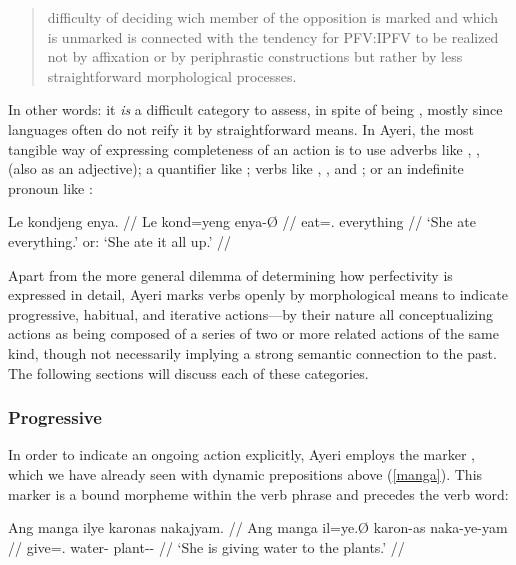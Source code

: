 \blockcquote[73]{dahl1985}{difficulty of deciding wich member of the 
opposition is marked and which is unmarked is connected with the tendency for 
PFV:IPFV to be realized not by affixation or by periphrastic constructions but 
rather by less straightforward morphological processes.}

In other words: it \emph{is} a difficult category to assess, in spite of being 
, 
mostly since languages often do not reify it by straightforward means. In 
Ayeri, the most tangible way of expressing completeness of an action is 
to use adverbs like , , 
 (also as an adjective); a quantifier 
like ; verbs like , 
, and ; or an indefinite pronoun 
like :

\ex\begingl
	\gla Le kondjeng enya. //
	\glb Le kond=yeng enya-Ø //
	\glc \PatTI{} eat=\TsgF{}.\Aarg{} everything //
	\glft `She ate everything.' or: `She ate it all up.' //
\endgl\xe

Apart from the more general dilemma of determining how perfectivity is expressed 
in detail, Ayeri marks verbs openly by morphological means to indicate 
progressive, habitual, and iterative actions---by their nature all 
conceptualizing actions as being composed of a series of two or more related 
actions of the same kind, though not necessarily implying a strong semantic 
connection to the past. The following sections will discuss each of these 
categories.

\subsubsection{Progressive}

In order to indicate an ongoing action explicitly, Ayeri employs the marker 
, which we have already seen with dynamic prepositions above 
(\autoref{manga}). This marker is a bound morpheme within the verb phrase and 
precedes the verb word:

\ex\label{ex:presprog}\begingl
	\gla Ang manga ilye karonas nakajyam. //
	\glb Ang manga il=ye.Ø karon-as naka-ye-yam //
	\glc \AgtT{} \Prog{} give=\TsgF{}.\Top{} water-\Parg{} 
		plant-\Pl{}-\Dat{} //
	\glft `She is giving water to the plants.' //
\endgl\xe

